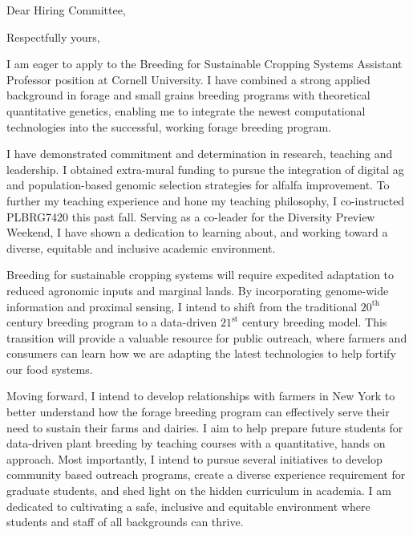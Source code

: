 \documentclass[11pt, letterpaper]{moderncv}
\begin{document}
\date{\today}
\opening{Dear Hiring Committee,}
\closing{Respectfully yours,}
\makelettertitle


I am eager to apply to the Breeding for Sustainable Cropping Systems Assistant Professor position at Cornell University. I have combined a strong applied background in forage and small grains breeding programs with theoretical quantitative genetics, enabling me to integrate the newest computational technologies into the successful, working forage breeding program.

I have demonstrated commitment and determination in research, teaching and leadership. I obtained extra-mural funding to pursue the integration of digital ag and population-based genomic selection strategies for alfalfa improvement. To further my teaching experience and hone my teaching philosophy, I co-instructed PLBRG7420 this past fall. Serving as a co-leader for the Diversity Preview Weekend, I have shown a dedication to learning about, and working toward a diverse, equitable and inclusive academic environment. 

Breeding for sustainable cropping systems will require expedited adaptation to reduced agronomic inputs and marginal lands. By incorporating genome-wide information and proximal sensing, I intend to shift from the traditional $20^\text{th}$ century breeding program to a data-driven $21^\text{st}$ century breeding model. This transition will provide a valuable resource for public outreach, where farmers and consumers can learn how we are adapting the latest technologies to help fortify our food systems.

Moving forward, I intend to develop relationships with farmers in New York to better understand how the forage breeding program can effectively serve their need to sustain their farms and dairies. I aim to help prepare future students for data-driven plant breeding by teaching courses with a quantitative, hands on approach. Most importantly, I intend to pursue several initiatives to develop community based outreach programs, create a diverse experience requirement for graduate students, and shed light on the hidden curriculum in academia. I am dedicated to cultivating a safe, inclusive and equitable environment where students and staff of all backgrounds can thrive. 
\end{document}
